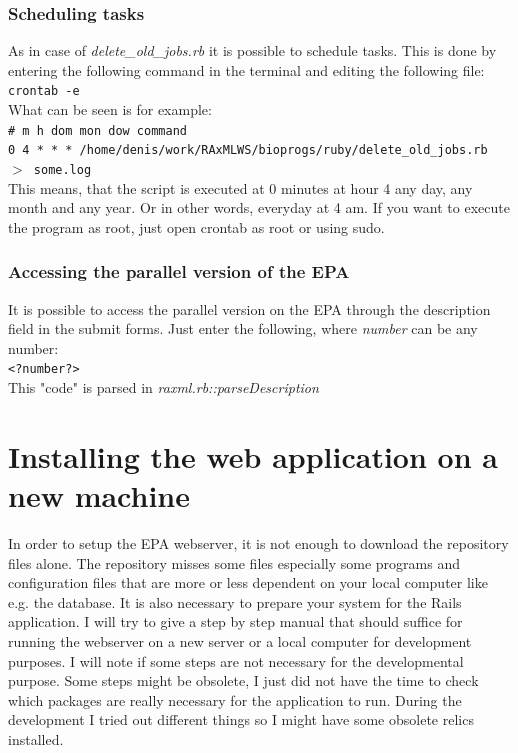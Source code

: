 \documentclass{scrartcl}
\begin{document}
		\subsubsection{Scheduling tasks}
			As in case of \textit{delete\_old\_jobs.rb} it is possible to schedule tasks. This is done by entering the following command in the terminal and editing the following file:\\
			\texttt{crontab -e} \\
			What can be seen is for example:\\
			\texttt{\# m h  dom mon dow   command} \\                                                                                                                                  
			\texttt{0 4 * * * /home/denis/work/RAxMLWS/bioprogs/ruby/delete\_old\_jobs.rb $>$ some.log    }\\
			This means, that the script is executed at 0 minutes at hour 4 any day, any month and any year. Or in other words, everyday at 4 am. If you want to execute the program as root, just open crontab as root or using sudo.
			
		\subsubsection{Accessing the parallel version of the EPA}
			It is possible to access the parallel version on the EPA through the description field in the submit forms. Just enter the following, where \textit{number} can be any number: \\
			\texttt{<?number?>} \\
			This "code" is parsed in \textit{raxml.rb::parseDescription}
			
	
	\section{Installing the web application on a new machine}
			In order to setup the EPA webserver, it is not enough to download the repository files alone. The repository misses some files especially some programs and configuration files that are more or less dependent on your local computer like e.g. the database. It is also necessary to prepare your system for the Rails application.  I will try to give a step by step manual that should suffice for running the webserver on a new server or a local computer for development purposes. I will note if some steps are not necessary for the developmental purpose. Some steps might be obsolete, I just did not have the time to check which packages are really necessary for the application to run. During the development I tried out different things so I might have some obsolete relics installed.\\
\end{document}
